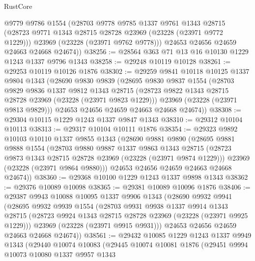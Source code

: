 \begin{lexlean}{RustCore}
\begin{coremodule}
        @9779
        @9786
        @1554
        (@28703
          @9778
          @9785
          @1337
          @9761
          @1343
          @28715
          (@28723 @9771 @1343 @28715 @28728 @23969 (@23228 (@23971 @9772 @1229)))
          @23969
          (@23228 (@23971 @9762 @9778)))
        @24653
        @24656
        @24659
        @24663
        @24668
        @24674))
@38256 := @28564 @363 @71 @13 @16 @10130 @1229 @1243 @1337 @9796 @1343
@38258 := @29248 @10119 @10128
@38261 := @29253 @10119 @10126 @1876
@38302 := @29259
    @9841
    @10118
    @10125
    @1337
    @9804
    @1343
    (@28690
      @9830
      @9839
      (@28695
        @9830
        @9837
        @1554
        (@28703
          @9829
          @9836
          @1337
          @9812
          @1343
          @28715
          (@28723 @9822 @1343 @28715 @28728 @23969 (@23228 (@23971 @9823 @1229)))
          @23969
          (@23228 (@23971 @9813 @9829)))
        @24653
        @24656
        @24659
        @24663
        @24668
        @24674))
@38308 := @29304 @10115 @1229 @1243 @1337 @9847 @1343
@38310 := @29312 @10104 @10113
@38313 := @29317 @10104 @10111 @1876
@38354 := @29323
    @9892
    @10103
    @10110
    @1337
    @9855
    @1343
    (@28690
      @9881
      @9890
      (@28695
        @9881
        @9888
        @1554
        (@28703
          @9880
          @9887
          @1337
          @9863
          @1343
          @28715
          (@28723 @9873 @1343 @28715 @28728 @23969 (@23228 (@23971 @9874 @1229)))
          @23969
          (@23228 (@23971 @9864 @9880)))
        @24653
        @24656
        @24659
        @24663
        @24668
        @24674))
@38360 := @29368 @10100 @1229 @1243 @1337 @9898 @1343
@38362 := @29376 @10089 @10098
@38365 := @29381 @10089 @10096 @1876
@38406 := @29387
    @9943
    @10088
    @10095
    @1337
    @9906
    @1343
    (@28690
      @9932
      @9941
      (@28695
        @9932
        @9939
        @1554
        (@28703
          @9931
          @9938
          @1337
          @9914
          @1343
          @28715
          (@28723 @9924 @1343 @28715 @28728 @23969 (@23228 (@23971 @9925 @1229)))
          @23969
          (@23228 (@23971 @9915 @9931)))
        @24653
        @24656
        @24659
        @24663
        @24668
        @24674))
@38561 := @29432
    @10085
    @1229
    @1243
    @1337
    @9949
    @1343
    (@29440
      @10074
      @10083
      (@29445
        @10074
        @10081
        @1876
        (@29451
          @9994
          @10073
          @10080
          @1337
          @9957
          @1343

\end{coremodule}
\end{lexlean}
